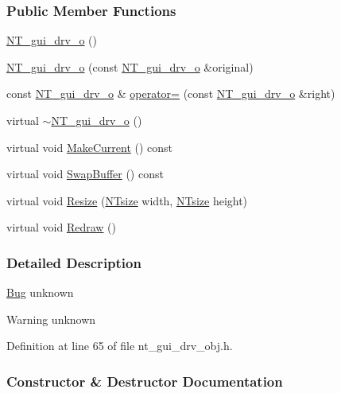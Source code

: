 \subsubsection*{Public Member Functions}
\begin{DoxyCompactItemize}
\item 
\hyperlink{class_n_t__gui__drv__o_a761082627204b6770332a4b7aeda9763}{NT\_\-gui\_\-drv\_\-o} ()
\item 
\hyperlink{class_n_t__gui__drv__o_a8b54a9c98361edf6a8ebb1b02b1ef5a0}{NT\_\-gui\_\-drv\_\-o} (const \hyperlink{class_n_t__gui__drv__o}{NT\_\-gui\_\-drv\_\-o} \&original)
\item 
const \hyperlink{class_n_t__gui__drv__o}{NT\_\-gui\_\-drv\_\-o} \& \hyperlink{class_n_t__gui__drv__o_a8710d52c9d2a83e2724825487e941a13}{operator=} (const \hyperlink{class_n_t__gui__drv__o}{NT\_\-gui\_\-drv\_\-o} \&right)
\item 
virtual \hyperlink{class_n_t__gui__drv__o_a96e6a0ba951a67ff286342f545fb147e}{$\sim$NT\_\-gui\_\-drv\_\-o} ()
\item 
virtual void \hyperlink{class_n_t__gui__drv__o_a0651d34262e643ba84edf90d5abe8658}{MakeCurrent} () const 
\item 
virtual void \hyperlink{class_n_t__gui__drv__o_a7768b915fdf7fa12b651ce7e44808ab5}{SwapBuffer} () const 
\item 
virtual void \hyperlink{class_n_t__gui__drv__o_adc7dbb33570f3382a95848e740219468}{Resize} (\hyperlink{nt__types_8h_a06c124f2e4469769b58230253ce0560b}{NTsize} width, \hyperlink{nt__types_8h_a06c124f2e4469769b58230253ce0560b}{NTsize} height)
\item 
virtual void \hyperlink{class_n_t__gui__drv__o_a6b39b26e79ca81a21255094b2335eaab}{Redraw} ()
\end{DoxyCompactItemize}


\subsubsection{Detailed Description}
\begin{Desc}
\item[\hyperlink{bug__bug000098}{Bug}]unknown \end{Desc}
\begin{DoxyWarning}{Warning}
unknown 
\end{DoxyWarning}


Definition at line 65 of file nt\_\-gui\_\-drv\_\-obj.h.



\subsubsection{Constructor \& Destructor Documentation}
